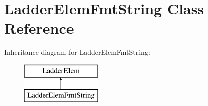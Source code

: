 \hypertarget{class_ladder_elem_fmt_string}{\section{Ladder\-Elem\-Fmt\-String Class Reference}
\label{class_ladder_elem_fmt_string}
}
Inheritance diagram for Ladder\-Elem\-Fmt\-String\-:\begin{figure}[H]
\begin{center}
\leavevmode
\includegraphics[height=2.000000cm]{class_ladder_elem_fmt_string}
\end{center}
\end{figure}
